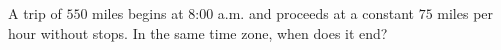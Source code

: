 A trip of $550$ miles begins at 8:00 a.m. and proceeds at a constant $75$ miles per hour without stops. In the same time zone, when does it end?
